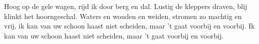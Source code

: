 \beginverse*
Hoog op de gele wagen, rijd ik door berg en dal.
Lustig de kleppers draven, blij klinkt het hoorngeschal.
Waters en wouden en weiden, stromen zo machtig en vrij,
ik kan van uw schoon haast niet scheiden,
maar 't gaat voorbij en voorbij.
Ik kan van uw schoon haast niet scheiden,
maar 't gaat voorbij en voorbij.
\endverse
\endsong